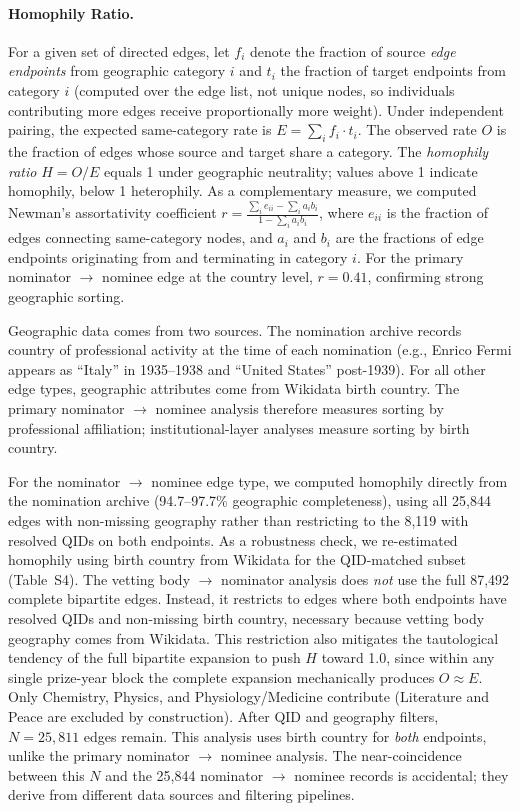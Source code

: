 \documentclass[12pt]{article}
\begin{document}
\paragraph*{Homophily Ratio.}

For a given set of directed edges, let $f_i$ denote the fraction of source \emph{edge endpoints} from geographic category $i$ and $t_i$ the fraction of target endpoints from category $i$ (computed over the edge list, not unique nodes, so individuals contributing more edges receive proportionally more weight). Under independent pairing, the expected same-category rate is $E = \sum_i f_i \cdot t_i$. The observed rate $O$ is the fraction of edges whose source and target share a category. The \emph{homophily ratio} $H = O / E$ equals 1 under geographic neutrality; values above 1 indicate homophily, below 1 heterophily. As a complementary measure, we computed Newman's assortativity coefficient \cite{New2003} $r = \frac{\sum_i e_{ii} - \sum_i a_i b_i}{1 - \sum_i a_i b_i}$, where $e_{ii}$ is the fraction of edges connecting same-category nodes, and $a_i$ and $b_i$ are the fractions of edge endpoints originating from and terminating in category $i$. For the primary nominator $\to$ nominee edge at the country level, $r = 0.41$, confirming strong geographic sorting.

Geographic data comes from two sources. The nomination archive records country of professional activity at the time of each nomination (e.g., Enrico Fermi appears as ``Italy'' in 1935--1938 and ``United States'' post-1939). For all other edge types, geographic attributes come from Wikidata birth country. The primary nominator $\to$ nominee analysis therefore measures sorting by professional affiliation; institutional-layer analyses measure sorting by birth country.

For the nominator $\to$ nominee edge type, we computed homophily directly from the nomination archive (94.7--97.7\% geographic completeness), using all 25,844 edges with non-missing geography rather than restricting to the 8,119 with resolved QIDs on both endpoints. As a robustness check, we re-estimated homophily using birth country from Wikidata for the QID-matched subset (Table~S4). The vetting body $\to$ nominator analysis does \emph{not} use the full 87,492 complete bipartite edges. Instead, it restricts to edges where both endpoints have resolved QIDs and non-missing birth country, necessary because vetting body geography comes from Wikidata. This restriction also mitigates the tautological tendency of the full bipartite expansion to push $H$ toward 1.0, since within any single prize-year block the complete expansion mechanically produces $O \approx E$. Only Chemistry, Physics, and Physiology/Medicine contribute (Literature and Peace are excluded by construction). After QID and geography filters, $N = 25{,}811$ edges remain. This analysis uses birth country for \emph{both} endpoints, unlike the primary nominator $\to$ nominee analysis. The near-coincidence between this $N$ and the 25,844 nominator $\to$ nominee records is accidental; they derive from different data sources and filtering pipelines.
\end{document}
